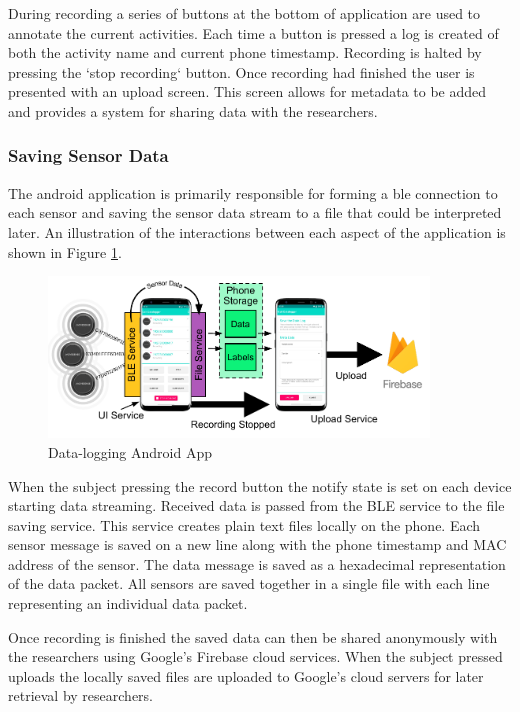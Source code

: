 During recording a series of buttons at the bottom of application are used to annotate the current activities. Each time a button is pressed a log is created of both the activity name and current phone timestamp. Recording is halted by pressing the `stop recording` button. Once recording had finished the user is presented with an upload screen. This screen allows for metadata to be added and provides a system for sharing data with the researchers.

\subsubsection{Saving Sensor Data}
The android application is primarily responsible for forming a \acrshort{ble} connection to each sensor and saving the sensor data stream to a file that could be interpreted later. An illustration of the interactions between each aspect of the application is shown in Figure \ref{fig:methods-android-app}.

\begin{figure}[hbt]
    \centering
    \includegraphics[width=0.9\textwidth]{content/3-Methods/Android_App.pdf}
    \caption{Data-logging Android App}
    \label{fig:methods-android-app}
\end{figure}

When the subject pressing the record button the notify state is set on each device starting data streaming. Received data is passed from the BLE service to the file saving service. This service creates plain text files locally on the phone. Each sensor message is saved on a new line along with the phone timestamp and MAC address of the sensor. The data message is saved as a hexadecimal representation of the data packet. All sensors are saved together in a single file with each line representing an individual data packet.

Once recording is finished the saved data can then be shared anonymously with the researchers using Google's Firebase cloud services. When the subject pressed uploads the locally saved files are uploaded to Google's cloud servers for later retrieval by researchers.


